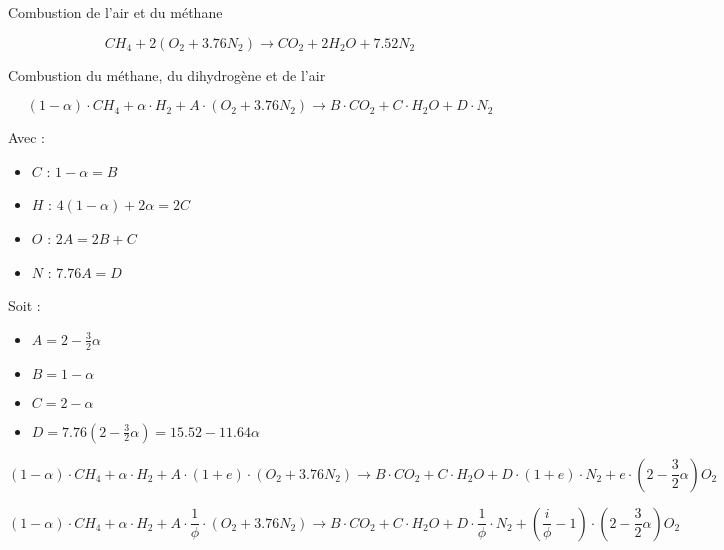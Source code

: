 Combustion de l'air et du méthane

$$ CH_4 + 2 (O_2 + 3.76 N_2) \rightarrow CO_2 + 2 H_2O + 7.52 N_2 $$

Combustion du méthane, du dihydrogène et de l'air

$$ (1 - \alpha) \cdot CH_4 + \alpha \cdot H_2 + A \cdot (O_2 + 3.76 N_2) \rightarrow B \cdot CO_2 + C \cdot H_2O + D \cdot N_2 $$

Avec :
\begin{itemize}
    \item[\ding{226}] $C$ : $ 1 - \alpha = B$
    \item[\ding{226}] $H$ : $ 4 (1-\alpha) + 2 \alpha = 2 C$
    \item[\ding{226}] $O$ : $ 2 A = 2 B + C$
    \item[\ding{226}] $N$ : $ 7.76 A = D$
\end{itemize}

Soit : 
\begin{itemize}
    \item[\ding{226}] $A = 2 - \frac{3}{2} \alpha$
    \item[\ding{226}] $B = 1 - \alpha$
    \item[\ding{226}] $C = 2 - \alpha$
    \item[\ding{226}] $D = 7.76 (2 - \frac{3}{2} \alpha) = 15.52 - 11.64 \alpha$
\end{itemize}

$$ (1 - \alpha) \cdot CH_4 + \alpha \cdot H_2 + A \cdot (1+e) \cdot (O_2 + 3.76 N_2) \rightarrow B \cdot CO_2 + C \cdot H_2O + D \cdot (1+e) \cdot N_2 + e \cdot (2-\frac{3}{2}\alpha) O_2 $$

$$ (1 - \alpha) \cdot CH_4 + \alpha \cdot H_2 + A \cdot \frac{1}{\phi} \cdot (O_2 + 3.76 N_2) \rightarrow B \cdot CO_2 + C \cdot H_2O + D \cdot \frac{1}{\phi} \cdot N_2 + (\frac{i}{\phi} - 1) \cdot (2-\frac{3}{2}\alpha) O_2 $$